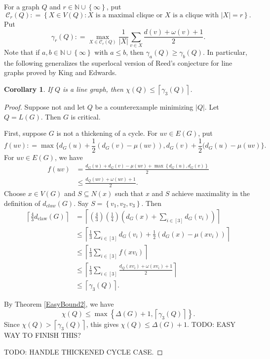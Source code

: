 \documentclass[12pt]{amsart}
\theoremstyle{plain}
\newtheorem{cor}[thm]{Corollary}
\theoremstyle{definition}
\theoremstyle{remark}
\newcommand{\fancy}[1]{\mathcal{#1}}
\newcommand{\C}{\fancy{C}}
\newcommand{\IN}{\mathbb{N}}
\newcommand{\set}[1]{\left\{ #1 \right\}}
\newcommand{\setb}[3]{\left\{ #1 \in #2 : #3 \right\}}
\newcommand{\card}[1]{\left|#1\right|}
\newcommand{\ceil}[1]{\left\lceil#1\right\rceil}
\newcommand{\irange}[1]{\left[#1\right]}
\newcommand{\parens}[1]{\left( #1 \right)}
\newcommand{\DefinedAs}{\mathrel{\mathop:}=}
\newcommand{\dclaw}[1]{d_{\text{claw}}\left( #1 \right)}
\begin{document}
For a graph $Q$ and $r \in \IN \cup \set{\infty}$, put 
\[\C_r(Q) \DefinedAs \setb{X}{V(Q)}{X \text{ is a maximal clique or } X \text { is a clique with } \card{X} = r}.\]
Put
\[\gamma_r(Q) \DefinedAs \max_{X \in \C_r(Q)} \frac{1}{|X|}\sum_{v \in X} \frac{d(v) + \omega(v) + 1}{2}.\]
Note that if $a, b \in \IN \cup \set{\infty}$ with $a \le b$, then $\gamma_a(Q) \ge \gamma_b(Q)$.  In particular, the following generalizes the superlocal version of Reed's conjecture for line graphs
proved by King and Edwards.

\begin{cor}\label{SuperDuperLocalReed}
If $Q$ is a line graph, then $\chi(Q) \le \ceil{\gamma_3(Q)}$.
\end{cor}
\begin{proof}
Suppose not and let $Q$ be a counterexample minimizing $\card{Q}$. Let $Q = L(G)$.  Then $G$ is critical.

First, suppose $G$ is not a thickening of a cycle. For $uv\in E(G)$, put 
\[f(uv) \DefinedAs \max\{d_G(u)+\frac12(d_G(v)-\mu(uv)),d_G(v)+\frac12(d_G(u)-\mu(uv)\}.\]
For $uv \in E(G)$, we have
\begin{align*}
f(uv) &= \frac{d_G(u) + d_G(v) - \mu(uv) + \max\set{d_G(u), d_G(v)}}{2}\\
&\le \frac{d_Q(uv) + \omega(uv) + 1}{2}.
\end{align*}
Choose $x\in V(G)$ and $S\subseteq N(x)$ such that $x$ and $S$ achieve maximality in the definition of $d_{claw}(G)$.  Say
$S = \set{v_1, v_2, v_3}$.  Then
\begin{align*}
\ceil{\frac43\dclaw{G}} &= \ceil{\parens{\frac43}\parens{\frac14}\parens{d_G(x)+\sum_{i \in \irange{3}} d_G(v_i)}} \\
&\le \ceil{\frac13\sum_{i \in \irange{3}} d_G(v_i) + \frac12(d_G(x) - \mu(xv_i))}\\
&\le \ceil{\frac13\sum_{i \in \irange{3}} f(xv_i)}\\
&\le \ceil{\frac13\sum_{i \in \irange{3}} \frac{d_Q(xv_i) + \omega(xv_i) + 1}{2}}\\
&\le \ceil{\gamma_3(Q)}.
\end{align*}

By Theorem \ref{EasyBound2}, we have
\[\chi(Q) \le \max\set{\Delta(G) + 1, \ceil{\gamma_3(Q)}}.\]
Since $\chi(Q) > \ceil{\gamma_3(Q)}$, this gives $\chi(Q) \le \Delta(G) + 1$.  TODO: EASY WAY TO FINISH THIS?

TODO: HANDLE THICKENED CYCLE CASE.
\end{proof}
\end{document}
